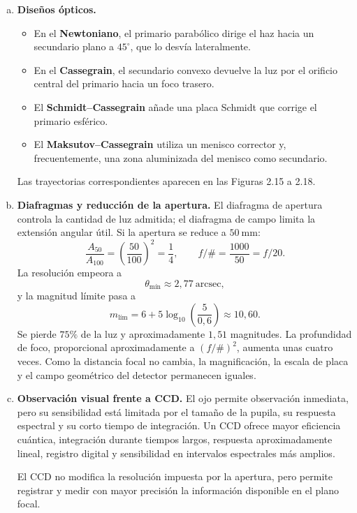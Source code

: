\begin{enumerate}[a)]
    \item \textbf{Diseños ópticos.}
    \begin{itemize}
        \item En el \textbf{Newtoniano}, el primario parabólico dirige el haz
        hacia un secundario plano a $45^\circ$, que lo desvía lateralmente.
        \item En el \textbf{Cassegrain}, el secundario convexo devuelve la luz
        por el orificio central del primario hacia un foco trasero.
        \item El \textbf{Schmidt--Cassegrain} añade una placa Schmidt que
        corrige el primario esférico.
        \item El \textbf{Maksutov--Cassegrain} utiliza un menisco corrector y,
        frecuentemente, una zona aluminizada del menisco como secundario.
    \end{itemize}
    Las trayectorias correspondientes aparecen en las Figuras 2.15 a 2.18.

    \item \textbf{Diafragmas y reducción de la apertura.}
    El diafragma de apertura controla la cantidad de luz admitida; el diafragma
    de campo limita la extensión angular útil. Si la apertura se reduce a
    $50~\text{mm}$:
    \[
        \frac{A_{50}}{A_{100}}
        =\left(\frac{50}{100}\right)^2=\frac14,
        \qquad
        f/\#=\frac{1000}{50}=f/20.
    \]
    La resolución empeora a
    \[
        \theta_{\text{mín}}\approx2{,}77~\text{arcsec},
    \]
    y la magnitud límite pasa a
    \[
        m_{\text{lím}}
        =6+5\log_{10}\left(\frac{5}{0{,}6}\right)
        \approx10{,}60.
    \]
    Se pierde $75\%$ de la luz y aproximadamente $1{,}51$ magnitudes. La
    profundidad de foco, proporcional aproximadamente a $(f/\#)^2$, aumenta
    unas cuatro veces. Como la distancia focal no cambia, la magnificación, la
    escala de placa y el campo geométrico del detector permanecen iguales.

    \item \textbf{Observación visual frente a CCD.}
    El ojo permite observación inmediata, pero su sensibilidad está limitada
    por el tamaño de la pupila, su respuesta espectral y su corto tiempo de
    integración. Un CCD ofrece mayor eficiencia cuántica, integración durante
    tiempos largos, respuesta aproximadamente lineal, registro digital y
    sensibilidad en intervalos espectrales más amplios.

    El CCD no modifica la resolución impuesta por la apertura, pero permite
    registrar y medir con mayor precisión la información disponible en el
    plano focal.
\end{enumerate}